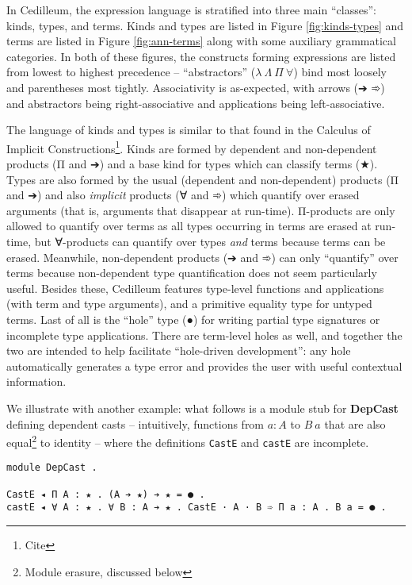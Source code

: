 \documentclass{article}
\begin{document}
In Cedilleum, the expression language is stratified into three main ``classes'':
kinds, types, and terms. Kinds and types are listed in Figure
\ref{fig:kinds-types} and terms are listed in Figure \ref{fig:ann-terms} along
with some auxiliary grammatical categories. In both of these figures, the
constructs forming expressions are listed from lowest to highest precedence --
``abstractors'' ($\lambda\ \Lambda\ \Pi\ \forall$) bind most loosely and
parentheses most tightly. Associativity is as-expected, with arrows (➔ ➾) and
abstractors being right-associative and applications being left-associative.

The language of kinds and types is similar to that found in the Calculus of
Implicit Constructions\footnote{Cite}. Kinds are formed by dependent and
non-dependent products (Π and ➔) and a base kind for types which can classify
terms (★). Types are also formed by the usual (dependent and non-dependent)
products (Π and ➔) and also \textit{implicit} products (∀ and ➾) which quantify
over erased arguments (that is, arguments that disappear at run-time).
Π-products are only allowed to quantify over terms as all types occurring in
terms are erased at run-time, but ∀-products can quantify over types
\textit{and} terms because terms can be erased. Meanwhile, non-dependent
products (➔ and ➾) can only ``quantify'' over terms because non-dependent type
quantification does not seem particularly useful. Besides these, Cedilleum
features type-level functions and applications (with term and type arguments),
and a primitive equality type for untyped terms. Last of all is the ``hole''
type (●) for writing partial type signatures or incomplete type applications.
There are term-level holes as well, and together the two are intended to help
facilitate ``hole-driven development'': any hole automatically generates a type
error and provides the user with useful contextual information.

We illustrate with another example: what follows is a module stub for
\textbf{DepCast} defining dependent casts -- intuitively, functions from $a : A$
to $B\ a$ that are also equal\footnote{Module erasure, discussed below} to
identity -- where the definitions \texttt{CastE} and \texttt{castE} are
incomplete.

\begin{verbatim}
module DepCast .

CastE ◂ Π A : ★ . (A ➔ ★) ➔ ★ = ● .
castE ◂ ∀ A : ★ . ∀ B : A ➔ ★ . CastE · A · B ➾ Π a : A . B a = ● .
\end{verbatim}
  
\end{document}
